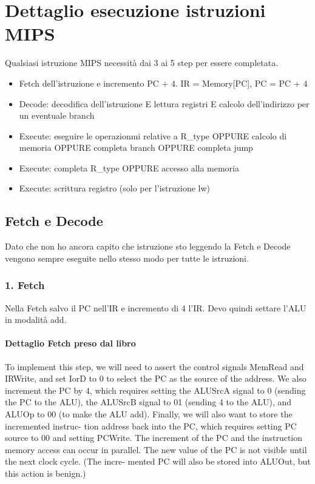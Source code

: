 \documentclass[12pt, a4paper, openany]{book}
\begin{document}
\section{Dettaglio esecuzione istruzioni MIPS}
Qualsiasi istruzione MIPS necessità dai 3 ai 5 step per essere completata.
\begin{itemize}
    \item Fetch dell'istruzione e incremento PC + 4. IR = Memory[PC], PC = PC + 4
    \item Decode: decodifica dell'istruzione E lettura registri E calcolo
    dell'indirizzo per un eventuale branch
    \item Execute: eseguire le operazionmi relative a R\_type OPPURE calcolo di memoria
    OPPURE completa branch OPPURE completa jump
    \item Execute: completa R\_type OPPURE accesso alla memoria
    \item Execute: scrittura registro (solo per l'istruzione lw)
\end{itemize}

\subsection{Fetch e Decode}
Dato che non ho ancora capito che istruzione sto leggendo la Fetch e Decode vengono sempre eseguite 
nello stesso modo per tutte le istruzioni.
\subsubsection*{1. Fetch} Nella Fetch salvo il PC nell'IR e incremento di 4 l'IR. Devo quindi settare l'ALU
in modalità add.
\paragraph*{Dettaglio Fetch preso dal libro}
To implement this step, we will need to assert the control signals MemRead and
IRWrite, and set IorD to 0 to select the PC as the source of the address. We also
increment the PC by 4, which requires setting the ALUSrcA signal to 0 (sending the
PC to the ALU), the ALUSrcB signal to 01 (sending 4 to the ALU), and ALUOp to 00
(to make the ALU add). Finally, we will also want to store the incremented instruc-
tion address back into the PC, which requires setting PC source to 00 and setting
PCWrite. The increment of the PC and the instruction memory access can occur in
parallel. The new value of the PC is not visible until the next clock cycle. (The incre-
mented PC will also be stored into ALUOut, but this action is benign.)
\end{document}
